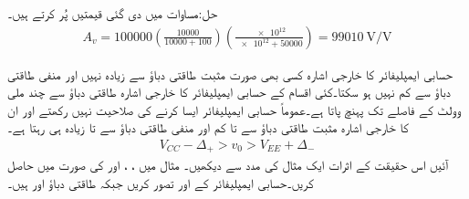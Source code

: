حل:مساوات  میں دی گئی قیمتیں پُر کرتے ہیں۔
\begin{align*}
A_v=\num{100000} \left(\frac{\num{10000}}{\num{10000}+100}\right)\left(\frac{\num{e12}}{\num{e12}+\num{50000}}\right)=\SI{99010}{\volt\per\volt}
\end{align*}

حسابی ایمپلیفائر کا خارجی اشارہ  کسی بھی صورت مثبت طاقتی دباؤ  سے زیادہ نہیں اور منفی طاقتی دباؤ  سے کم نہیں ہو سکتا۔کئی اقسام کے حسابی ایمپلیفائر کا خارجی اشارہ طاقتی دباؤ سے چند ملی وولٹ کے فاصلے تک پہنچ پاتا ہے۔عموماً حسابی ایمپلیفائر ایسا کرنے کی صلاحیت نہیں رکھتے اور ان کا خارجی اشارہ مثبت طاقتی دباؤ سے  تا  کم اور منفی  طاقتی دباؤ سے  تا  زیادہ  ہی رہتا ہے۔
\begin{align}\label{مساوات_حسابی_خارجی_حدود}
V_{CC}-\Delta_+ > v_0 > V_{EE}+\Delta_-
\end{align}
آئیں اس حقیقت کے اثرات ایک مثال کی مدد سے دیکھیں۔
مثال  میں ، ،  اور  کی صورت میں  حاصل کریں۔حسابی ایمپلیفائر کے  اور  تصور کریں  جبکہ طاقتی دباؤ  اور  ہیں۔

